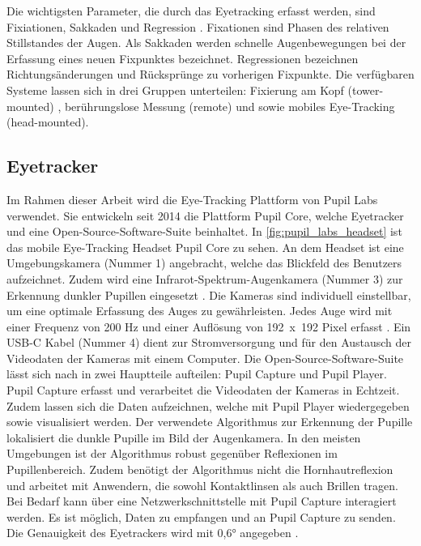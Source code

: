 Die wichtigsten Parameter, die durch das Eyetracking erfasst werden, sind Fixiationen, Sakkaden und Regression \cite{BartlPokorny.2013}. \glqq Fixationen sind Phasen des relativen Stillstandes der Augen.\grqq \cite{Blake.2013} Als Sakkaden werden schnelle Augenbewegungen bei der Erfassung eines neuen Fixpunktes bezeichnet. Regressionen bezeichnen Richtungsänderungen und Rücksprünge zu vorherigen Fixpunkte. Die verfügbaren Systeme lassen sich in drei Gruppen unterteilen: Fixierung am Kopf (tower-mounted) , berührungslose Messung (remote) und sowie mobiles Eye-Tracking (head-mounted). \cite{BartlPokorny.2013}

\subsection{Eyetracker}
Im Rahmen dieser Arbeit wird die Eye-Tracking Plattform von Pupil Labs verwendet. Sie entwickeln seit 2014 die Plattform Pupil Core, welche Eyetracker und eine Open-Source-Software-Suite beinhaltet. In \autoref{fig:pupil_labs_headset} ist das mobile Eye-Tracking Headset Pupil Core zu sehen. An dem Headset ist eine Umgebungskamera (Nummer 1) angebracht, welche das Blickfeld des Benutzers aufzeichnet. Zudem wird eine Infrarot-Spektrum-Augenkamera (Nummer 3) zur Erkennung dunkler Pupillen eingesetzt \cite{Kassner_2014}. Die Kameras sind individuell einstellbar, um eine optimale Erfassung des Auges zu gewährleisten. Jedes Auge wird mit einer Frequenz von 200 Hz und einer Auflösung von \mbox{192 x 192} Pixel erfasst \cite{PupilLabsSpec}. Ein USB-C Kabel (Nummer 4) dient zur Stromversorgung und für den Austausch der Videodaten der Kameras mit einem Computer. Die Open-Source-Software-Suite lässt sich nach \citeauthor{Kassner_2014} in zwei Hauptteile aufteilen: Pupil Capture und Pupil Player. Pupil Capture erfasst und verarbeitet die Videodaten der Kameras in Echtzeit. Zudem lassen sich die Daten aufzeichnen, welche mit Pupil Player wiedergegeben sowie visualisiert werden. Der verwendete Algorithmus zur Erkennung der Pupille lokalisiert die dunkle Pupille im Bild der Augenkamera. In den meisten Umgebungen ist der Algorithmus robust gegenüber Reflexionen im Pupillenbereich. Zudem benötigt der Algorithmus nicht die Hornhautreflexion und arbeitet mit Anwendern, die sowohl Kontaktlinsen als auch Brillen tragen. \cite{Kassner_2014} Bei Bedarf kann über eine Netzwerkschnittstelle mit Pupil Capture interagiert werden. Es ist möglich, Daten zu empfangen und an Pupil Capture zu senden. \cite{PupilLabsNet} Die Genauigkeit des Eyetrackers wird mit 0,6° angegeben \cite{PupilLabsSpec}.

